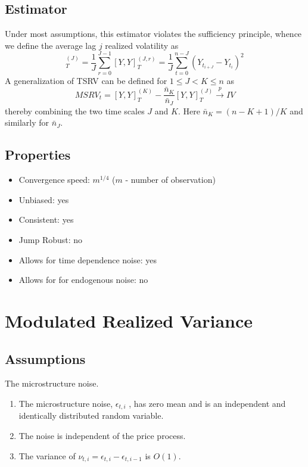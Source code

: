 \documentclass[letterpaper]{report}
\begin{document}
\subsection{Estimator}
Under most assumptions, this estimator violates the sufficiency principle,
whence we define the average lag $j$ realized volatility as
\begin{equation}
[Y,Y]^{(J)}_T = \frac{1}{J}\sum_{r=0}^{J-1}[Y,Y]^{(J,r)}_T =
\frac{1}{J}\sum_{t=0}^{n-J}(Y_{t_{i+J}}-Y_{t_i})^2
\end{equation}
A generalization of TSRV can be defined for $1\leq J < K \leq n$ as
\begin{equation}
MSRV_t = [Y,Y]^{(K)}_T-\frac{\bar{n}_K}{\bar{n}_J}[Y,Y]^{(J)}_T \stackrel{p}{\to} IV
\end{equation}
thereby combining the two time scales $J$ and $K$. Here $\bar{n}_K = (n - K
+1)/K$ and similarly for $\bar{n}_J$.
\subsection{Properties}
\begin{itemize}
\item Convergence speed: $m^{1/4}$ ($m$ - number of observation)
\item Unbiased: yes
\item Consistent: yes
\item Jump Robust: no
\item Allows for time dependence noise: yes
\item Allows for for endogenous noise: no
\end{itemize} 

\thispagestyle{plain}
 
\section{Modulated Realized Variance}
\subsection{Assumptions}
The microstructure noise.
\begin{enumerate}
\item The microstructure noise, $\epsilon_{t,i}$ , has zero mean and is an
independent and identically distributed random variable.
\item The noise is independent of the price process.
\item The variance of $\nu_{t,i} = \epsilon_{t,i} - \epsilon_{t,i-1}$ is
$O(1)$.
\end{enumerate}
\end{document}
